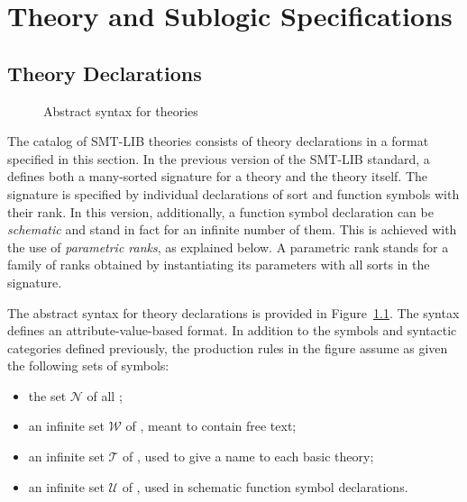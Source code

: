 

\chapter{Theory and Sublogic Specifications} 
\thispagestyle{empty}


\section{Theory Declarations}

\begin{figure}
\theories
\caption{Abstract syntax for theories}
\label{fig:abstract-theories}
\end{figure}


The catalog of SMT-LIB theories consists of theory declarations
in a format specified in this section.
In the previous version of the SMT-LIB standard,
a  defines both 
a many-sorted signature for a theory and the theory itself.
The signature is specified by individual declarations of sort 
and function symbols with their rank.
In this version, additionally,
a function symbol declaration can be \emph{schematic} and 
stand in fact for an infinite number of them.
This is achieved with the use of \emph{parametric ranks}, as explained below.
A parametric rank stands for a family of ranks
obtained by instantiating its parameters with all sorts in the signature.

The abstract syntax for theory declarations
is provided in Figure~\ref{fig:abstract-theories}.
The syntax defines an attribute-value-based format.
In addition to the symbols and syntactic categories defined previously,
the production rules in the figure assume as given 
the following sets of symbols:
\begin{itemize}
\item
the set $\mathcal{N}$ of all ;
\item
an infinite set $\mathcal{W}$ of ,
meant to contain free text;
\item
an infinite set $\mathcal{T}$ of ,
used to give a name to each basic theory;
\item
an infinite set $\mathcal{U}$ of ,
used in schematic function symbol declarations.
\end{itemize}

